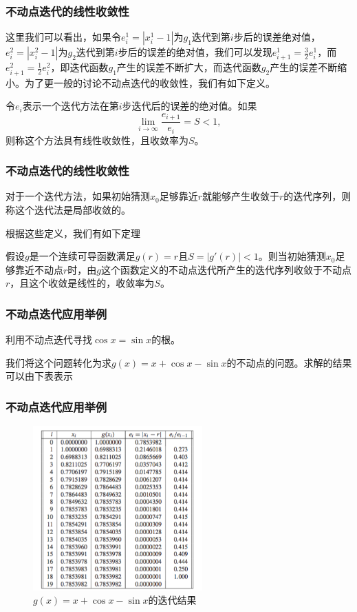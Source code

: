 \documentclass[10pt]{beamer}
\begin{document}
\begin{frame}
\frametitle{不动点迭代的线性收敛性}
这里我们可以看出，如果令$e^1_i = |x^1_i -1|$为$g_1$迭代到第$i$步后的误差绝对值，$e^2_i = |x^2_i -1|$为$g_2$迭代到第$i$步后的误差的绝对值，我们可以发现$e^1_{i+1} = \frac{3}{2} e^1_i$，而$e^2_{i+1} = \frac{1}{2} e^2_i$，即迭代函数$g_1$产生的误差不断扩大，而迭代函数$g_2$产生的误差不断缩小。为了更一般的讨论不动点迭代的收敛性，我们有如下定义。

\begin{definition}[线性收敛]
令$e_i$表示一个迭代方法在第$i$步迭代后的误差的绝对值。如果
\begin{equation}
\lim_{i \rightarrow \infty} \frac{e_{i+1}}{e_i} = S <1,
\end{equation}
则称这个方法具有线性收敛性，且收敛率为$S$。
\end{definition}
\end{frame}

\begin{frame}
\frametitle{不动点迭代的线性收敛性}
\begin{definition}[局部收敛]
对于一个迭代方法，如果初始猜测$x_0$足够靠近$r$就能够产生收敛于$r$的迭代序列，则称这个迭代法是局部收敛的。
\end{definition}

根据这些定义，我们有如下定理
\begin{theorem}[不动点迭代的线性收敛性]
假设$g$是一个连续可导函数满足$g(r) = r$且$S = |g'(r)| < 1$。则当初始猜测$x_0$足够靠近不动点$r$时，由$g$这个函数定义的不动点迭代所产生的迭代序列收敛于不动点$r$，且这个收敛是线性的，收敛率为$S$。
\end{theorem}
\end{frame}


\begin{frame}
\frametitle{不动点迭代应用举例}
\begin{example}
利用不动点迭代寻找$\cos x = \sin x$的根。
\end{example}
我们将这个问题转化为求$g(x) = x + \cos x - \sin x$的不动点的问题。求解的结果可以由下表表示
\end{frame}


\begin{frame}
\frametitle{不动点迭代应用举例}
\begin{figure}
\includegraphics[width=6.5cm]{figs/FPI_Ex_1_Results.png} 
\caption{$g(x) = x + \cos x - \sin x$的迭代结果} 
\end{figure}
\end{frame}
\end{document}
